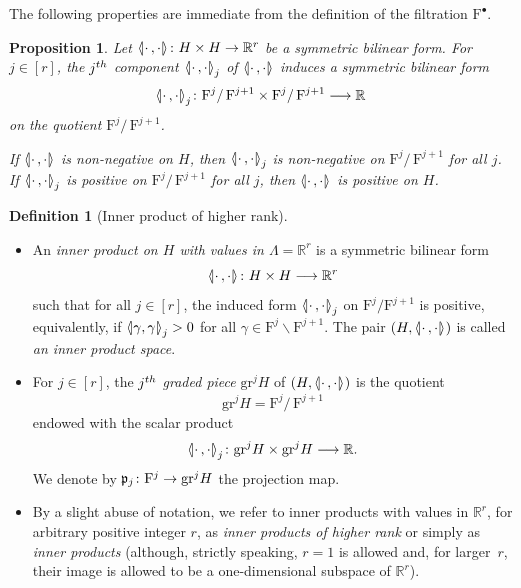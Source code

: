 \documentclass[10pt,a4paper]{amsart}
\newcommand{\llangle}{\mathopen{\langle\mkern -3.1mu\lvert}}
\newcommand{\rrangle}{\mathclose{\rvert\mkern -3.1mu\rangle}}
\newcommand{\highinn}[2]{{\llangle#2\rrangle_{#1}}}
\newcommand{\rquot}[2]{#1/\,#2}
\newcommand{\filter}{\mathrm{F}}
\newcommand{\R}{\mathbb{R}}
\newcommand{\grm}[2]{\mathrm{gr}_{#1}^{#2}}
\newcommand{\proj}{\mathfrak{p}}
\renewcommand{\setminus}{\smallsetminus}
\renewcommand*{\to}{\mathchoice{\longrightarrow}{\rightarrow}{\rightarrow}{\rightarrow}}
\newtheorem{prop}[cdrthm]{Proposition}
\theoremstyle{definition}\newtheorem{defi}[cdrthm]{Definition}
\begin{document}
\setcounter{cdrthm}{3}
The following properties are immediate from the definition of the filtration $\filter^\bullet$.

\begin{prop}\label{prop:GradedForms}
Let $\highinn{}{\cdot \,, \cdot} \colon H \times H \to \R^r$ be a symmetric bilinear form. For $j \in [r]$, the $j^{\rm th}$ component $\highinn{j}{\cdot \,, \cdot}$ of $\highinn{}{\cdot \,, \cdot}$ induces a symmetric bilinear form
\[
\highinn{j}{\cdot\,, \cdot} \colon \rquot{\filter^j}{\filter^{j+1}} \times \rquot{\filter^j}{\filter^{j+1}} \to \R
\]
on the quotient $\rquot{\filter^j}{\filter^{j+1}}$.

If $\highinn{}{\cdot \,, \cdot}$ is non-negative on $H$, then $\highinn{j}{\cdot \,, \cdot}$ is non-negative on $\rquot{\filter^j}{\filter^{j+1}}$ for all $j$. If $\highinn{j}{\cdot \,, \cdot}$ is positive on $\rquot{\filter^j}{\filter^{j+1}}$ for all $j$, then $\highinn{}{\cdot \,, \cdot}$ is positive on $H$.
\end{prop}



\begin{defi}[Inner product of higher rank] \label{defi:InnerProduct}\leavevmode
\begin{itemize}
\item An \emph{inner product on $H$ with values in $\Lambda = \R^r$} is a symmetric bilinear form
\[
\highinn{}{\cdot\,, \cdot} \colon H \times H \to \R^r
\]
such that for all $j \in [r]$, the induced form $\highinn{j}{\cdot\,, \cdot}$ on $\filter^j / \filter^{j+1}$ is positive, equivalently, if $\highinn{j}{\gamma, \gamma} >0$ for all $\gamma \in \filter^j \setminus \filter^{j+1}$. The pair $(H, \highinn{}{\cdot\,, \cdot})$ is called \emph{an inner product space}.

\item For $j \in [r]$, the $j^{\rm th}$ \emph{graded piece} $\grm{}{j}H$ of $(H, \highinn{}{\cdot\,, \cdot})$ is the quotient
\[
\grm{}{j}H = \rquot{\filter^j}{\filter^{j+1}}
\]
endowed with the scalar product
\[
\highinn{j}{\cdot\,, \cdot} \colon \grm{}{j}H\times \grm{}{j}H \to \R.
\]
We denote by $\proj_j \colon \filter^j \to \grm{}{j}H$ the projection map.

\item By a slight abuse of notation, we refer to inner products with values in $\R^r$, for arbitrary positive integer $r$, as \emph{inner products of higher rank} or simply as \emph{inner products} (although, strictly speaking, $r=1$ is allowed and, for larger~$r$, their image is allowed to be a one-dimensional subspace of $\R^r$).%
\end{itemize}
\end{defi}
\end{document}
